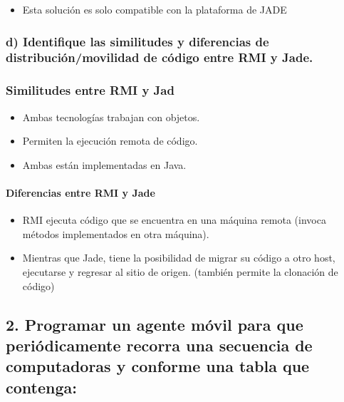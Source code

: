 \documentclass[11pt]{article}
\providecommand{\tightlist}{%
      \setlength{\itemsep}{0pt}\setlength{\parskip}{0pt}}
\begin{document}
\begin{itemize}
\tightlist
\item
  Esta solución es solo compatible con la plataforma de JADE
\end{itemize}

    \hypertarget{d-identifique-las-similitudes-y-diferencias-de-distribuciuxf3nmovilidad-de-cuxf3digo-entre-rmi-y-jade.}{%
\subsubsection{d) Identifique las similitudes y diferencias de
distribución/movilidad de código entre RMI y
Jade.}\label{d-identifique-las-similitudes-y-diferencias-de-distribuciuxf3nmovilidad-de-cuxf3digo-entre-rmi-y-jade.}}

    \hypertarget{similitudes-entre-rmi-y-jad}{%
\subsubsection{Similitudes entre RMI y
Jad}\label{similitudes-entre-rmi-y-jad}}

\begin{itemize}
\tightlist
\item
  Ambas tecnologías trabajan con objetos.
\item
  Permiten la ejecución remota de código.
\item
  Ambas están implementadas en Java.
\end{itemize}

\hypertarget{diferencias-entre-rmi-y-jade}{%
\paragraph{Diferencias entre RMI y
Jade}\label{diferencias-entre-rmi-y-jade}}

\begin{itemize}
\tightlist
\item
  RMI ejecuta código que se encuentra en una máquina remota (invoca
  métodos implementados en otra máquina).
\item
  Mientras que Jade, tiene la posibilidad de migrar su código a otro
  host, ejecutarse y regresar al sitio de origen. (también permite la
  clonación de código)
\end{itemize}

    \hypertarget{programar-un-agente-muxf3vil-para-que-periuxf3dicamente-recorra-una-secuencia-de-computadoras-y-conforme-una-tabla-que-contenga}{%
\subsection{2. Programar un agente móvil para que periódicamente recorra
una secuencia de computadoras y conforme una tabla que
contenga:}\label{programar-un-agente-muxf3vil-para-que-periuxf3dicamente-recorra-una-secuencia-de-computadoras-y-conforme-una-tabla-que-contenga}}
\end{document}
